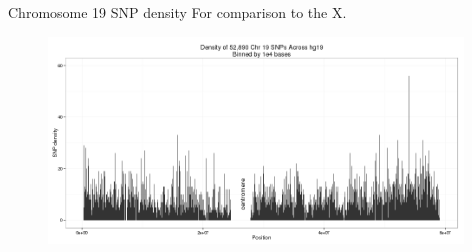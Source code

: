 \documentclass{beamer}
\begin{document}
\begin{frame}{Chromosome 19 SNP density}
For comparison to the X.
\begin{figure}
\includegraphics[width=11cm]{../olga_update_27july2015/chr19_density.png}
\end{figure}
\end{frame}
\end{document}
